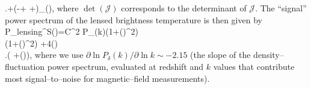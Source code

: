 \left.+\left(-+\bm{\sigma}
+\bm{\Omega}\right)\cdot\bm{\nabla}_{}{\delta}({})\right\rbrace,
\ega
\eeq
where $\det(\mathcal{J})$ corresponds to the determinant of $\mathcal{J}$. The ``signal'' power spectrum of the lensed brightness temperature is then given by
\beq
\bga
P_{\rm lensing}^S({})=C^2 P_{\delta}(k)\left(1+(\cdot{})^2\right) \\
\times\left\lbrace \left(1+(\cdot{})^2\right) 
+4(\cdot{})\\
\left.\times\left(\cdot\bm{\sigma}\cdot{}
+(\bm{\Omega}\times{})\cdot{}\right)\right\rbrace,
\label{eq:Tb_power}
\ega
\eeq
where we use $\partial\ln P_\delta(k)/\partial\ln k\sim -2.15$ (the slope of the density--fluctuation power spectrum, evaluated at redshift and $k$ values that contribute most signal--to--noise for magnetic--field measurements).

